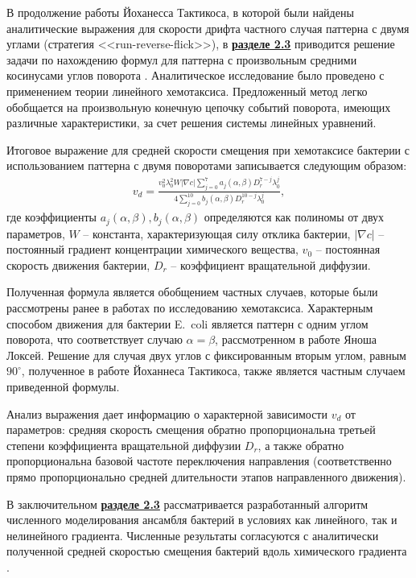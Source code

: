 В продолжение работы Йоханесса Тактикоса, в которой были найдены аналитические выражения для скорости дрифта частного случая паттерна с двумя углами (стратегия <<run-reverse-flick>>), в \underline{\textbf{разделе 2.3}} приводится решение задачи по нахождению формул для паттерна с произвольным средними косинусами углов поворота \cite{bib2}. Аналитическое исследование было проведено с применением теории линейного хемотаксиса. Предложенный метод легко обобщается на произвольную конечную цепочку событий поворота, имеющих различные характеристики, за счет решения системы линейных уравнений.

Итоговое выражение для средней скорости смещения при хемотаксисе бактерии с использованием паттерна с двумя поворотами записывается следующим образом:
\begin{equation}
    \begin{aligned}
        v_d=\frac{v_0^2\lambda_0^2W|\nabla c|\sum_{j=0}^{7} a_j(\alpha, \beta)D_r^{7-j}\lambda_0^j}{4\sum_{j=0}^{10}b_j(\alpha,\beta)D_r^{10-j}\lambda_0^j},
        \label{eq:drift-speed-solution}
    \end{aligned}
\end{equation}
где коэффициенты $a_j(\alpha,\beta), b_j(\alpha,\beta)$ определяются как полиномы от двух параметров, $W$ -- константа, характеризующая силу отклика бактерии, $|\nabla c|$ -- постоянный градиент концентрации химического вещества, $v_0$ -- постоянная скорость движения бактерии, $D_r$ -- коэффициент вращательной диффузии.

Полученная формула является обобщением частных случаев, которые были рассмотрены ранее в работах по исследованию хемотаксиса. Характерным способом движения для бактерии E.~coli является паттерн с одним углом поворота, что соответствует случаю $\alpha=\beta$, рассмотренном в работе Яноша Локсей. Решение для случая двух углов с фиксированным вторым углом, равным $90^\circ$, полученное в работе Йоханнеса Тактикоса, также является частным случаем приведенной формулы.

Анализ выражения дает информацию о характерной зависимости $v_d$ от параметров: средняя скорость смещения обратно пропорциональна третьей степени коэффициента вращательной диффузии $D_r$, а также обратно пропорциональна базовой частоте переключения направления (соответственно прямо пропорционально средней длительности этапов направленного движения). 

В заключительном \underline{\textbf{разделе 2.3}} рассматривается разработанный алгоритм численного моделирования ансамбля бактерий в условиях как линейного, так и нелинейного градиента. Численные результаты согласуются с аналитически полученной средней скоростью смещения бактерий вдоль химического градиента \cite{confbib6}.



